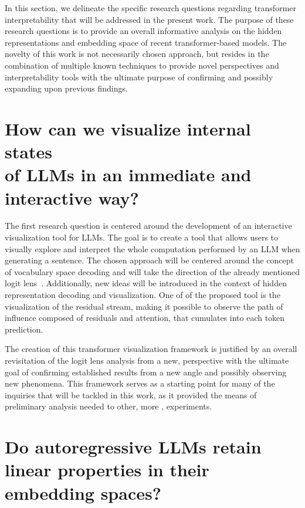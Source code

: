 In this section, we delineate the specific research questions regarding transformer interpretability that will be addressed in the present work.
The purpose of these research questions is to provide an overall informative analysis on the hidden representations and embedding space of recent transformer-based models.
The novelty of this work is not necessarily  chosen approach, but resides in the combination of multiple known techniques to provide novel perspectives and interpretability tools with the ultimate purpose of confirming and possibly expanding upon previous findings.

\section{How can we visualize internal states \texorpdfstring{ \\ }{} of LLMs in an immediate and \texorpdfstring{ \\ }{} interactive way?}\label{sec:rq_intravisto}

The first research question is centered around the development of an interactive visualization tool for LLMs.
The goal is to create a tool that allows users to visually explore and interpret the whole computation performed by an LLM when generating a sentence.
The chosen approach will be centered around the concept of vocabulary space decoding and will take the direction of the already mentioned logit lens~\cite{nostalgebraist2020}.
Additionally, new ideas will be introduced in the context of hidden representation decoding and visualization.
One of  of the proposed tool is the visualization of the residual stream, making it possible to observe the path of influence composed of residuals and attention, that cumulates into each token prediction.

The creation of this transformer visualization framework is justified by an overall revisitation of the logit lens analysis from a new,  perspective with the ultimate goal of confirming established results from a new angle and possibly observing new phenomena.
This framework serves as a starting point for many of the inquiries that will be tackled in this work, as it provided the means of preliminary analysis needed to  other, more , experiments.

\section{Do autoregressive LLMs retain linear properties in their embedding spaces?}\label{sec:rq_embeddings}

